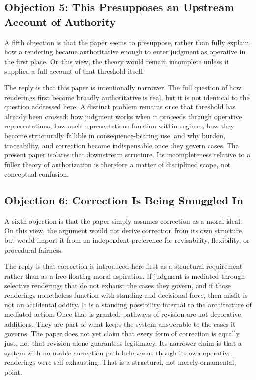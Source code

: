 \documentclass[11pt]{article}
\begin{document}
\subsection{Objection 5: This Presupposes an Upstream Account of Authority}

A fifth objection is that the paper seems to presuppose, rather than fully explain, how a rendering became authoritative enough to enter judgment as operative in the first place. On this view, the theory would remain incomplete unless it supplied a full account of that threshold itself.

The reply is that this paper is intentionally narrower. The full question of how renderings first become broadly authoritative is real, but it is not identical to the question addressed here. A distinct problem remains once that threshold has already been crossed: how judgment works when it proceeds through operative representations, how such representations function within regimes, how they become structurally fallible in consequence-bearing use, and why burden, traceability, and correction become indispensable once they govern cases. The present paper isolates that downstream structure. Its incompleteness relative to a fuller theory of authorization is therefore a matter of disciplined scope, not conceptual confusion.

\subsection{Objection 6: Correction Is Being Smuggled In}

A sixth objection is that the paper simply assumes correction as a moral ideal. On this view, the argument would not derive correction from its own structure, but would import it from an independent preference for revisability, flexibility, or procedural fairness.

The reply is that correction is introduced here first as a structural requirement rather than as a free-floating moral aspiration. If judgment is mediated through selective renderings that do not exhaust the cases they govern, and if those renderings nonetheless function with standing and decisional force, then misfit is not an accidental oddity. It is a standing possibility internal to the architecture of mediated action. Once that is granted, pathways of revision are not decorative additions. They are part of what keeps the system answerable to the cases it governs. The paper does not yet claim that every form of correction is equally just, nor that revision alone guarantees legitimacy. Its narrower claim is that a system with no usable correction path behaves as though its own operative renderings were self-exhausting. That is a structural, not merely ornamental, point.
\end{document}

